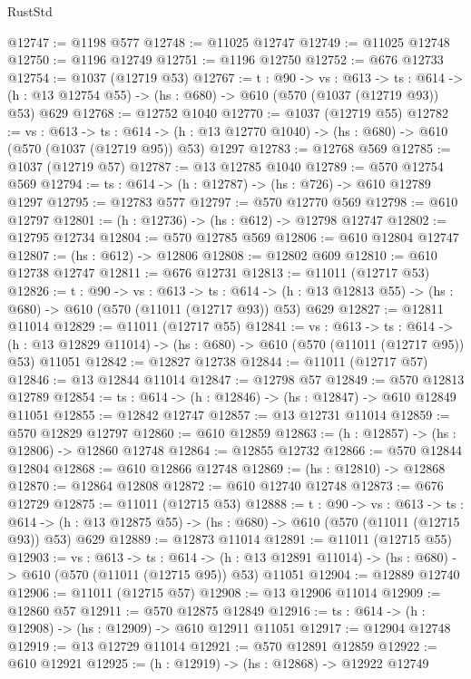 \begin{lexlean}{RustStd}
\begin{coremodule}
@12747 := @1198 @577
@12748 := @11025 @12747
@12749 := @11025 @12748
@12750 := @1196 @12749
@12751 := @1196 @12750
@12752 := @676 @12733
@12754 := @1037 (@12719 @53)
@12767 := {t : @90} ->
  {vs : @613} ->
  {ts : @614} -> (h : @13 @12754 @55) -> (hs : @680) -> @610 (@570 (@1037 (@12719 @93)) @53) @629
@12768 := @12752 @1040
@12770 := @1037 (@12719 @55)
@12782 := {vs : @613} ->
  {ts : @614} -> (h : @13 @12770 @1040) -> (hs : @680) -> @610 (@570 (@1037 (@12719 @95)) @53) @1297
@12783 := @12768 @569
@12785 := @1037 (@12719 @57)
@12787 := @13 @12785 @1040
@12789 := @570 @12754 @569
@12794 := {ts : @614} -> (h : @12787) -> (hs : @726) -> @610 @12789 @1297
@12795 := @12783 @577
@12797 := @570 @12770 @569
@12798 := @610 @12797
@12801 := (h : @12736) -> (hs : @612) -> @12798 @12747
@12802 := @12795 @12734
@12804 := @570 @12785 @569
@12806 := @610 @12804 @12747
@12807 := (hs : @612) -> @12806
@12808 := @12802 @609
@12810 := @610 @12738 @12747
@12811 := @676 @12731
@12813 := @11011 (@12717 @53)
@12826 := {t : @90} ->
  {vs : @613} ->
  {ts : @614} -> (h : @13 @12813 @55) -> (hs : @680) -> @610 (@570 (@11011 (@12717 @93)) @53) @629
@12827 := @12811 @11014
@12829 := @11011 (@12717 @55)
@12841 := {vs : @613} ->
  {ts : @614} ->
  (h : @13 @12829 @11014) -> (hs : @680) -> @610 (@570 (@11011 (@12717 @95)) @53) @11051
@12842 := @12827 @12738
@12844 := @11011 (@12717 @57)
@12846 := @13 @12844 @11014
@12847 := @12798 @57
@12849 := @570 @12813 @12789
@12854 := {ts : @614} -> (h : @12846) -> (hs : @12847) -> @610 @12849 @11051
@12855 := @12842 @12747
@12857 := @13 @12731 @11014
@12859 := @570 @12829 @12797
@12860 := @610 @12859
@12863 := (h : @12857) -> (hs : @12806) -> @12860 @12748
@12864 := @12855 @12732
@12866 := @570 @12844 @12804
@12868 := @610 @12866 @12748
@12869 := (hs : @12810) -> @12868
@12870 := @12864 @12808
@12872 := @610 @12740 @12748
@12873 := @676 @12729
@12875 := @11011 (@12715 @53)
@12888 := {t : @90} ->
  {vs : @613} ->
  {ts : @614} -> (h : @13 @12875 @55) -> (hs : @680) -> @610 (@570 (@11011 (@12715 @93)) @53) @629
@12889 := @12873 @11014
@12891 := @11011 (@12715 @55)
@12903 := {vs : @613} ->
  {ts : @614} ->
  (h : @13 @12891 @11014) -> (hs : @680) -> @610 (@570 (@11011 (@12715 @95)) @53) @11051
@12904 := @12889 @12740
@12906 := @11011 (@12715 @57)
@12908 := @13 @12906 @11014
@12909 := @12860 @57
@12911 := @570 @12875 @12849
@12916 := {ts : @614} -> (h : @12908) -> (hs : @12909) -> @610 @12911 @11051
@12917 := @12904 @12748
@12919 := @13 @12729 @11014
@12921 := @570 @12891 @12859
@12922 := @610 @12921
@12925 := (h : @12919) -> (hs : @12868) -> @12922 @12749

\end{coremodule}
\end{lexlean}
